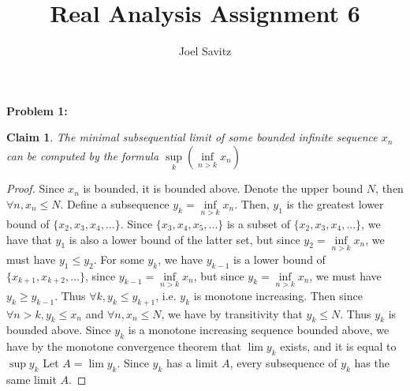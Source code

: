 \documentclass{article}
\title{Real Analysis Assignment 6}
\author{Joel Savitz}
\newtheorem{clm}{Claim}
\begin{document}
\maketitle

\textbf{Problem 1:}

\begin{clm}
	The minimal subsequential limit of some bounded infinite sequence $x_n$
	can be computed by the formula
	$\underset{k}{\sup}(\underset{n > k}{\inf} x_n)$
\end{clm}

\begin{proof}
	Since $x_n$ is bounded, it is bounded above.
	Denote the upper bound $N$, then $\forall n, x_n \le N$.
	Define a subsequence $y_k = \underset{n > k}{\inf} x_n$.
	Then, $y_1$ is the greatest lower bound of $\{ x_2, x_3, x_4, ... \}$.
	Since $\{ x_3, x_4, x_5, ... \}$ is a subset of $\{ x_2, x_3, x_4, ... \}$,
	we have that $y_1$ is also a lower bound of the latter set,
	but since $y_2 = \underset{n > k}{\inf} x_n$,
	we must have $y_1 \le y_2$.
	For some $y_k$,
	we have $y_{k-1}$ is a lower bound of $\{ x_{k + 1}, x_{k+2}, ...\}$,
	since $y_{k - 1} = \underset{n > k}{\inf} x_n$,
	but since $y_k = \underset{n > k}{\inf} x_n$,
	we must have $y_k \ge y_{k - 1}$.
	Thus $\forall k, y_k \le y_{k + 1}$, i.e. $y_k$ is monotone increasing.
	Then since $\forall n > k, y_k \le x_n$ and $\forall n, x_n \le N$,
	we have by transitivity that $y_k \le N$.
	Thus $y_k$ is bounded above.
	Since $y_k$ is a monotone increasing sequence bounded above,
	we have by the monotone convergence theorem that $\lim y_k$ exists,
	and it is equal to $\sup y_k$
	Let $A = \lim y_k$.
	Since $y_k$ has a limit $A$,
	every subsequence of $y_k$ has the same limit $A$.


\end{proof}
\end{document}
